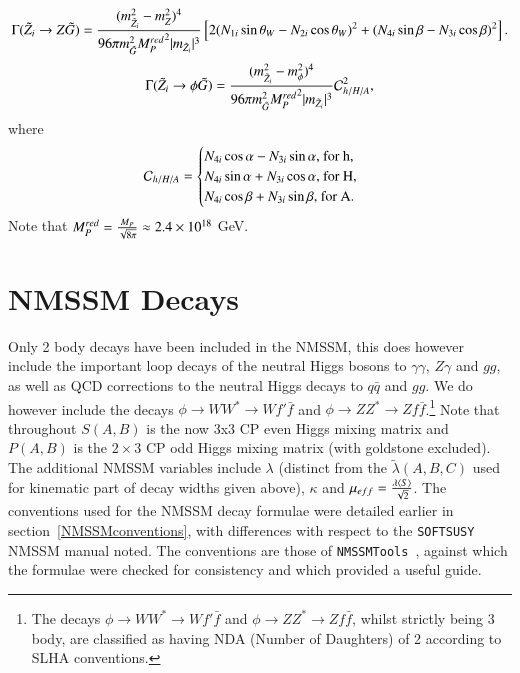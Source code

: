 \documentclass[final,3p,times,pdflatex]{elsarticle}
\begin{document}
\begin{equation} \label{neutZgrav}
\Gamma(\tilde{Z}_i \rightarrow Z \tilde{G}) = {(m_{\tilde{Z}_i}^2 - m_{Z}^2)^4 \over 96 \pi m_{\tilde{G}}^2 {M_{P}^{red}}^2 |m_{\tilde{Z}_i}|^3}\left[2(N_{1i}\sin\theta_W - N_{2i}\cos\theta_W)^2 + (N_{4i}\sin\beta-N_{3i}\cos\beta)^2\right].
\end{equation}
\begin{equation} \label{neutphigrav}
\Gamma(\tilde{Z}_i \rightarrow \phi \tilde{G}) = {(m_{\tilde{Z}_i}^2 - m_{\phi}^2)^4 \over 96 \pi m_{\tilde{G}}^2 {M_{P}^{red}}^2 |m_{\tilde{Z}_i}|^3}\mathcal{C}_{h/H/A}^2,
\end{equation}
where
\begin{equation}
\mathcal{C}_{h/H/A} = \begin{cases} N_{4i}\cos\alpha - N_{3i}\sin\alpha $, for h, $ \\
									N_{4i}\sin\alpha + N_{3i}\cos\alpha $, for H, $ \\
									N_{4i}\cos\beta + N_{3i} \sin\beta $, for A. $
						\end{cases}
\end{equation}
Note that $M_{P}^{red} = {M_{P} \over \sqrt{8\pi}} \approx 2.4 \times 10^{18} $ GeV.

\section{NMSSM Decays} \label{appendix:NMSSMdec}
Only 2 body decays have been included in the NMSSM, this does however include
the important loop decays of the neutral Higgs bosons to $\gamma\gamma$,
$Z\gamma$ and $gg$, as well as QCD corrections to the neutral Higgs decays to
$q\bar{q}$ and $gg$. We do however include the decays $\phi \rightarrow WW^*
\rightarrow Wf'\bar{f}$ and $\phi \rightarrow ZZ^* \rightarrow
Zf\bar{f}$.\footnote{The decays $\phi \rightarrow WW^* \rightarrow Wf'\bar{f}$
  and $\phi \rightarrow ZZ^* \rightarrow Zf\bar{f}$, whilst strictly being 3
  body, are classified as having NDA (Number of Daughters) of 2 according to
  SLHA conventions.} 
Note that throughout $S(A,B)$ is the now 3x3 CP even Higgs mixing matrix and $P(A,B)$ is the  $2\times3$ CP odd Higgs mixing matrix (with goldstone excluded). The additional NMSSM variables include $\lambda$ (distinct from the $\tilde{\lambda}(A,B,C)$ used for kinematic part of decay widths given above), $\kappa$ and $\mu_{eff} = {\lambda \langle S \rangle \over \sqrt{2}}$. The conventions used for the NMSSM decay formulae were detailed earlier in section~\ref{NMSSMconventions}, with differences with respect to the {\tt SOFTSUSY} NMSSM manual \cite{Allanach:2013kza} noted. The conventions are those of {\tt NMSSMTools}~\cite{Ellwanger:2004xm,Ellwanger:2006rn,Ellwanger:2012dd,Ellwanger:2006ch}, against which the formulae were checked for consistency and which provided a useful guide.
\end{document}
